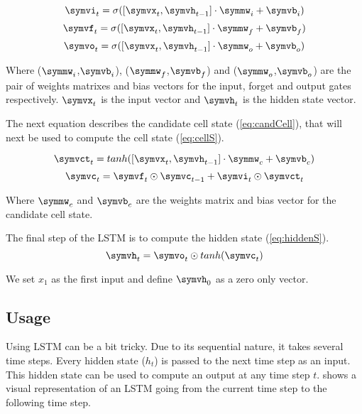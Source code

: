 \begin{equation}\label{eq:inputG}
  \symvi_t=\sigma ([\symvx_{t},\symvh_{t-1}]\cdot \symmw_i + \symvb_i)
\end{equation}
\begin{equation}\label{eq:forgetG}
  \symvf_t=\sigma ([\symvx_{t},\symvh_{t-1}]\cdot \symmw_f + \symvb_f)
\end{equation}
\begin{equation}\label{eq:outputG}
  \symvo_t=\sigma ([\symvx_{t},\symvh_{t-1}]\cdot \symmw_o + \symvb_o)
\end{equation}

Where ($\symmw_i$,$\symvb_i$), ($\symmw_f$,$\symvb_f$) and ($\symmw_o$,$\symvb_o$) are the pair of weights matrixes and bias vectors for the input, forget and output gates respectively. $\symvx_t$ is the input vector and $\symvh_t$ is the hidden state vector.

The next equation describes the candidate cell state (\cref{eq:candCell}), that will next be used to compute the cell state (\cref{eq:cellS}).

\begin{equation}\label{eq:candCell}
  \symvct_t=tanh([\symvx_{t},\symvh_{t-1}]\cdot \symmw_c+ \symvb_c)
\end{equation}
\begin{equation}\label{eq:cellS}
  \symvc_t=\symvf_t\odot \symvc_{t-1} + \symvi_t \odot \symvct_t
\end{equation}

Where $\symmw_c$ and $\symvb_c$ are the weights matrix and bias vector for the candidate cell state.

The final step of the \ac{LSTM} is to compute the hidden state (\cref{eq:hiddenS}).
\begin{equation}\label{eq:hiddenS}
  \symvh_t=\symvo_t\odot tanh(\symvc_t)
\end{equation}

We set $x_1$ as the first input and define $\symvh_0$ as a zero only vector.

\subsection{Usage}

Using \ac{LSTM} can be a bit tricky. Due to its sequential nature, it takes several time steps. Every hidden state ($h_t$) is passed to the next time step as an input. This hidden state can be used to compute an output at any time step $t$.  shows a visual representation of an \ac{LSTM} going from the current time step to the following time step.

